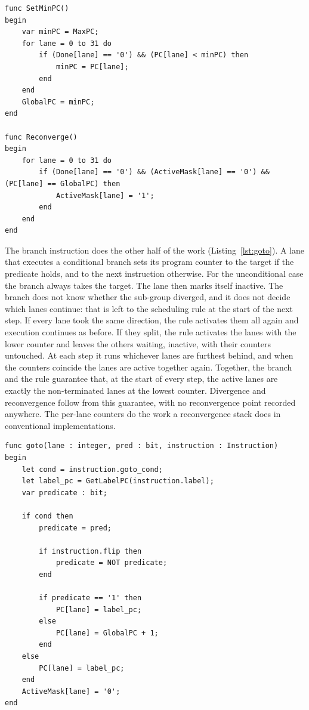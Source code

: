 \begin{lstlisting}[caption={The scheduling rule, run at the start of each
step.}, label={lst:min-pc}]
func SetMinPC()
begin
    var minPC = MaxPC;
    for lane = 0 to 31 do
        if (Done[lane] == '0') && (PC[lane] < minPC) then
            minPC = PC[lane];
        end
    end
    GlobalPC = minPC;
end

func Reconverge()
begin
    for lane = 0 to 31 do
        if (Done[lane] == '0') && (ActiveMask[lane] == '0') && (PC[lane] == GlobalPC) then
            ActiveMask[lane] = '1';
        end
    end
end
\end{lstlisting}

The branch instruction does the other half of the work
(Listing~\ref{lst:goto}). A lane that executes a conditional branch sets its program
counter to the target if the predicate holds, and to the next instruction otherwise. 
For the unconditional case the branch always takes the target. The lane then marks 
itself inactive. The branch does not know whether the sub-group diverged, and it does not decide which
lanes continue: that is left to the scheduling rule at the start of the next
step. If every lane took the same direction, the rule activates them all
again and execution continues as before. If they split, the rule activates
the lanes with the lower counter and leaves the others waiting, inactive,
with their counters untouched. At each step it runs whichever lanes are
furthest behind, and when the counters coincide the lanes are active
together again. Together, the branch and the rule guarantee that, at the start of every
step, the active lanes are exactly the non-terminated lanes at the lowest
counter. Divergence and reconvergence follow from this guarantee, with no
reconvergence point recorded anywhere. The per-lane counters do the work a
reconvergence stack does in conventional implementations.

\begin{lstlisting}[caption={The semantic function of \texttt{goto}.},
label={lst:goto}]
func goto(lane : integer, pred : bit, instruction : Instruction)
begin
    let cond = instruction.goto_cond;
    let label_pc = GetLabelPC(instruction.label);
    var predicate : bit;

    if cond then
        predicate = pred;

        if instruction.flip then
            predicate = NOT predicate;
        end

        if predicate == '1' then
            PC[lane] = label_pc;
        else
            PC[lane] = GlobalPC + 1;
        end
    else
        PC[lane] = label_pc;
    end
    ActiveMask[lane] = '0';
end
\end{lstlisting}

